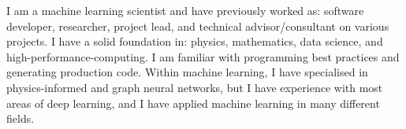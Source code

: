 



I am a machine learning scientist and have previously worked as: software developer, researcher, project lead, and technical advisor/consultant on various projects.
I have a solid foundation in: physics, mathematics, data science, and high-performance-computing.
I am familiar with programming best practices and generating production code.
Within machine learning, I have specialised in physics-informed and graph neural networks, but I have experience with most areas of deep learning, and I have applied machine learning in many different fields.



